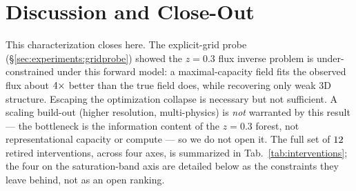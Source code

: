 \section{Discussion and Close-Out}
\label{sec:nextsteps}

This characterization closes here. The explicit-grid probe (\S\ref{sec:experiments:gridprobe}) showed the $z = 0.3$ flux inverse problem is under-constrained under this forward model: a maximal-capacity field fits the observed flux about $4\times$ better than the true field does, while recovering only weak 3D structure. Escaping the optimization collapse is necessary but not sufficient. A scaling build-out (higher resolution, multi-physics) is \emph{not} warranted by this result --- the bottleneck is the information content of the $z = 0.3$ forest, not representational capacity or compute --- so we do not open it. The full set of $12$ retired interventions, across four axes, is summarized in Tab.~\ref{tab:interventions}; the four on the saturation-band axis are detailed below as the constraints they leave behind, not as an open ranking.

